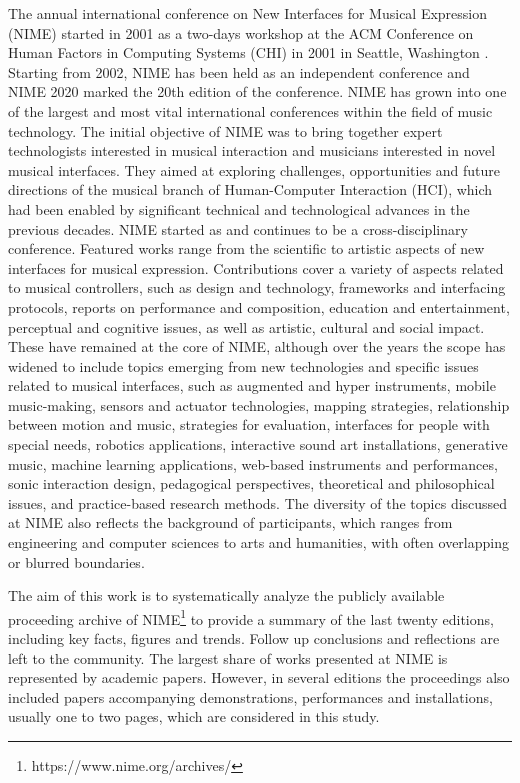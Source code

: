 \documentclass[sigconf]{nimeart}
\begin{document}
The annual international conference on New Interfaces for Musical Expression (NIME) started in 2001 as a two-days workshop at the ACM Conference on Human Factors in Computing Systems (CHI) in 2001 in Seattle, Washington \cite{poupyrev_new_2001}. Starting from 2002, NIME has been held as an independent conference and NIME 2020 marked the 20th edition of the conference. NIME has grown into one of the largest and most vital international conferences within the field of music technology. The initial objective of NIME was to bring together expert technologists interested in musical interaction and musicians interested in novel musical interfaces. They aimed at exploring challenges, opportunities and future directions of the musical branch of Human-Computer Interaction (HCI), which had been enabled by significant technical and technological advances in the previous decades. NIME started as and continues to be a cross-disciplinary conference. Featured works range from the scientific to artistic aspects of new interfaces for musical expression. Contributions cover a variety of aspects related to musical controllers, such as design and technology, frameworks and interfacing protocols, reports on performance and composition, education and entertainment, perceptual and cognitive issues, as well as artistic, cultural and social impact. These have remained at the core of NIME, although over the years the scope has widened to include topics emerging from new technologies and specific issues related to musical interfaces, such as augmented and hyper instruments, mobile music-making, sensors and actuator technologies, mapping strategies, relationship between motion and music, strategies for evaluation, interfaces for people with special needs, robotics applications, interactive sound art installations, generative music, machine learning applications, web-based instruments and performances, sonic interaction design, pedagogical perspectives, theoretical and philosophical issues, and practice-based research methods. The diversity of the topics discussed at NIME also reflects the background of participants, which ranges from engineering and computer sciences to arts and humanities, with often overlapping or blurred boundaries.~

The aim of this work is to systematically analyze the publicly available proceeding archive of NIME\footnote{https://www.nime.org/archives/} to provide a summary of the last twenty editions, including key facts, figures and trends. Follow up conclusions and reflections are left to the community. The largest share of works presented at NIME is represented by academic papers. However, in several editions the proceedings also included papers accompanying demonstrations, performances and installations, usually one to two pages, which are considered in this study.
\end{document}
